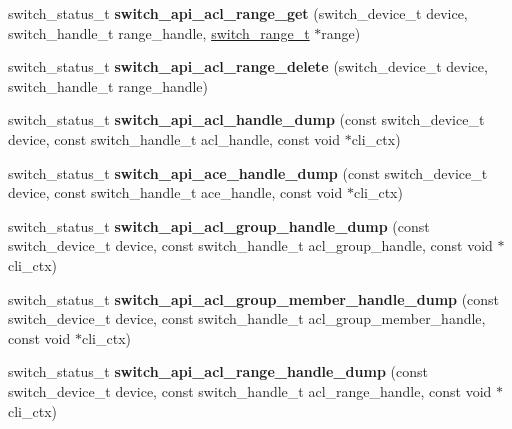 \begin{DoxyCompactItemize}
\item 
\hypertarget{group__ACL_ga2b1148c3eaf236552270ff43a84a1066}{switch\+\_\+status\+\_\+t {\bfseries switch\+\_\+api\+\_\+acl\+\_\+range\+\_\+get} (switch\+\_\+device\+\_\+t device, switch\+\_\+handle\+\_\+t range\+\_\+handle, \hyperlink{structswitch__range__}{switch\+\_\+range\+\_\+t} $\ast$range)}\label{group__ACL_ga2b1148c3eaf236552270ff43a84a1066}

\item 
\hypertarget{group__ACL_ga042cfa77907a4c117c4f87d7fc4af996}{switch\+\_\+status\+\_\+t {\bfseries switch\+\_\+api\+\_\+acl\+\_\+range\+\_\+delete} (switch\+\_\+device\+\_\+t device, switch\+\_\+handle\+\_\+t range\+\_\+handle)}\label{group__ACL_ga042cfa77907a4c117c4f87d7fc4af996}

\item 
\hypertarget{group__ACL_ga62d68f3131f5474a3dfac2e247679d9e}{switch\+\_\+status\+\_\+t {\bfseries switch\+\_\+api\+\_\+acl\+\_\+handle\+\_\+dump} (const switch\+\_\+device\+\_\+t device, const switch\+\_\+handle\+\_\+t acl\+\_\+handle, const void $\ast$cli\+\_\+ctx)}\label{group__ACL_ga62d68f3131f5474a3dfac2e247679d9e}

\item 
\hypertarget{group__ACL_ga6ea1c887f286035e47ad561a9a34286d}{switch\+\_\+status\+\_\+t {\bfseries switch\+\_\+api\+\_\+ace\+\_\+handle\+\_\+dump} (const switch\+\_\+device\+\_\+t device, const switch\+\_\+handle\+\_\+t ace\+\_\+handle, const void $\ast$cli\+\_\+ctx)}\label{group__ACL_ga6ea1c887f286035e47ad561a9a34286d}

\item 
\hypertarget{group__ACL_ga018f420ea7a12c9706b7ee815815652a}{switch\+\_\+status\+\_\+t {\bfseries switch\+\_\+api\+\_\+acl\+\_\+group\+\_\+handle\+\_\+dump} (const switch\+\_\+device\+\_\+t device, const switch\+\_\+handle\+\_\+t acl\+\_\+group\+\_\+handle, const void $\ast$cli\+\_\+ctx)}\label{group__ACL_ga018f420ea7a12c9706b7ee815815652a}

\item 
\hypertarget{group__ACL_ga5e343f815a15e905b40aedd9e9737a86}{switch\+\_\+status\+\_\+t {\bfseries switch\+\_\+api\+\_\+acl\+\_\+group\+\_\+member\+\_\+handle\+\_\+dump} (const switch\+\_\+device\+\_\+t device, const switch\+\_\+handle\+\_\+t acl\+\_\+group\+\_\+member\+\_\+handle, const void $\ast$cli\+\_\+ctx)}\label{group__ACL_ga5e343f815a15e905b40aedd9e9737a86}

\item 
\hypertarget{group__ACL_ga3244fc0f004037918f4956dba21669a6}{switch\+\_\+status\+\_\+t {\bfseries switch\+\_\+api\+\_\+acl\+\_\+range\+\_\+handle\+\_\+dump} (const switch\+\_\+device\+\_\+t device, const switch\+\_\+handle\+\_\+t acl\+\_\+range\+\_\+handle, const void $\ast$cli\+\_\+ctx)}\label{group__ACL_ga3244fc0f004037918f4956dba21669a6}


\end{DoxyCompactItemize}
